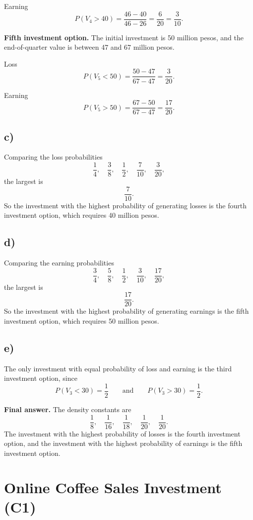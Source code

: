 Earning
\[
P(V_4>40)=\frac{46-40}{46-26}=\frac{6}{20}=\frac{3}{10}.
\]

\medskip

\textbf{Fifth investment option.}
The initial investment is 50 million pesos, and the end-of-quarter value is between 47 and 67 million pesos.

Loss
\[
P(V_5<50)=\frac{50-47}{67-47}=\frac{3}{20}.
\]

Earning
\[
P(V_5>50)=\frac{67-50}{67-47}=\frac{17}{20}.
\]

\subsection*{c)}
Comparing the loss probabilities
\[
\frac14,\quad \frac38,\quad \frac12,\quad \frac{7}{10},\quad \frac{3}{20},
\]
the largest is
\[
\frac{7}{10}.
\]
So the investment with the highest probability of generating losses is the fourth investment option, which requires 40 million pesos.

\subsection*{d)}
Comparing the earning probabilities
\[
\frac34,\quad \frac58,\quad \frac12,\quad \frac{3}{10},\quad \frac{17}{20},
\]
the largest is
\[
\frac{17}{20}.
\]
So the investment with the highest probability of generating earnings is the fifth investment option, which requires 50 million pesos.

\subsection*{e)}
The only investment with equal probability of loss and earning is the third investment option, since
\[
P(V_3<30)=\frac12
\qquad \text{and} \qquad
P(V_3>30)=\frac12.
\]

\textbf{Final answer.}
The density constants are
\[
\frac18,\quad \frac{1}{16},\quad \frac{1}{18},\quad \frac{1}{20},\quad \frac{1}{20}.
\]
The investment with the highest probability of losses is the fourth investment option, and the investment with the highest probability of earnings is the fifth investment option.


\section{Online Coffee Sales Investment (C1)}

